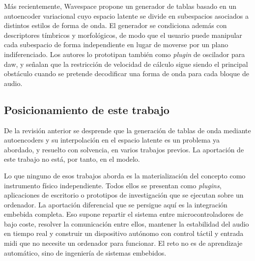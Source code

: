 Más recientemente, Wavespace \cite{Lee2024} propone un generador de tablas
basado en un autoencoder variacional cuyo espacio latente se divide en subespacios 
asociados a distintos estilos de forma de onda. El generador se condiciona además 
con descriptores tímbricos y morfológicos, de modo que el usuario puede manipular 
cada subespacio de forma independiente en lugar de moverse por un plano indiferenciado.
Los autores lo prototipan también como \emph{plugin} de oscilador para \gls{daw}, y
señalan que la restricción de velocidad de cálculo sigue siendo el principal
obstáculo cuando se pretende decodificar una forma de onda para cada bloque de
audio.

\subsection{Posicionamiento de este trabajo}
\hypertarget{RE1.1c}{}\label{RE1.1c}

De la revisión anterior se desprende que la generación de tablas de onda
mediante autoencoders y su interpolación en el espacio latente es un problema ya
abordado, y resuelto con solvencia, en varios trabajos previos. La aportación de
este trabajo no está, por tanto, en el modelo.

Lo que ninguno de esos trabajos aborda es la materialización del concepto como
instrumento físico independiente. Todos ellos se presentan como
\emph{plugins}, aplicaciones de escritorio o prototipos de investigación que se
ejecutan sobre un ordenador. La aportación diferencial que se persigue aquí es
la integración embebida completa. Eso supone repartir el sistema entre
microcontroladores de bajo coste, resolver la comunicación entre ellos, mantener
la estabilidad del audio en tiempo real y construir un dispositivo autónomo con
control táctil y entrada \gls{midi} que no necesite un ordenador para funcionar.
El reto no es de aprendizaje automático, sino de ingeniería de sistemas
embebidos.
